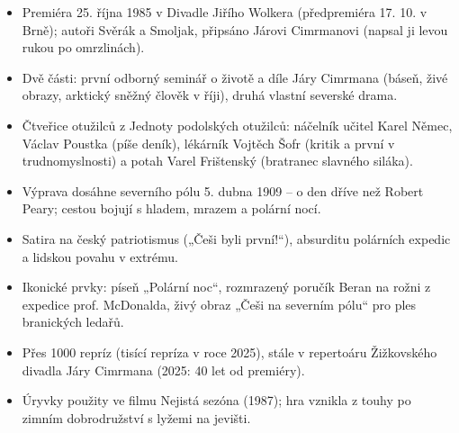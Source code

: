 \documentclass{article}
\begin{document}
\begin{minipage}[t]{0.30\textwidth}
\vspace{0pt}
\begin{itemize}[label=\textcolor{WPP}{$\faGreaterThan$}]
\item Premiéra 25. října 1985 v Divadle Jiřího Wolkera (předpremiéra 17. 10. v Brně); autoři Svěrák a Smoljak, připsáno Járovi Cimrmanovi (napsal ji levou rukou po omrzlinách).
\item Dvě části: první odborný seminář o životě a díle Járy Cimrmana (báseň, živé obrazy, arktický sněžný člověk v říji), druhá vlastní severské drama.
\item Čtveřice otužilců z Jednoty podolských otužilců: náčelník učitel Karel Němec, Václav Poustka (píše deník), lékárník Vojtěch Šofr (kritik a první v trudnomyslnosti) a potah Varel Frištenský (bratranec slavného siláka).
\item Výprava dosáhne severního pólu 5. dubna 1909 – o den dříve než Robert Peary; cestou bojují s hladem, mrazem a polární nocí.
\item Satira na český patriotismus („Češi byli první!“), absurditu polárních expedic a lidskou povahu v extrému.
\item Ikonické prvky: píseň „Polární noc“, rozmrazený poručík Beran na rožni z expedice prof. McDonalda, živý obraz „Češi na severním pólu“ pro ples branických ledařů.
\item Přes 1000 repríz (tisící repríza v roce 2025), stále v repertoáru Žižkovského divadla Járy Cimrmana (2025: 40 let od premiéry).
\item Úryvky použity ve filmu Nejistá sezóna (1987); hra vznikla z touhy po zimním dobrodružství s lyžemi na jevišti.
\end{itemize}
\end{minipage}%
\hfill
\end{document}
